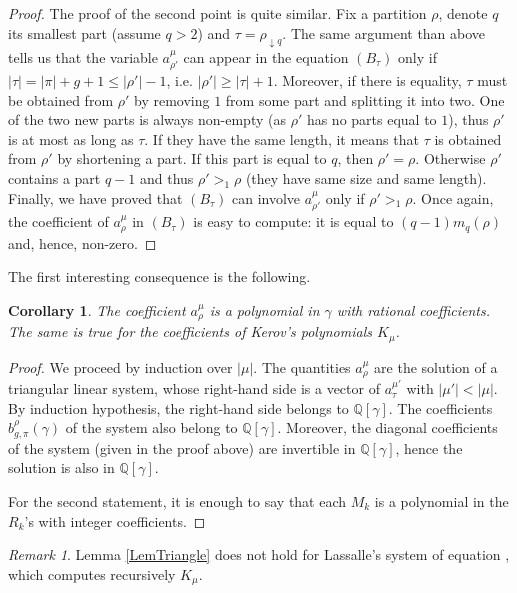 \documentclass[11pt]{amsart}
\theoremstyle{plain}
\newtheorem{corollary}[lemma]{Corollary}
\theoremstyle{remark}
\newtheorem*{remark}{Remark}
\newcommand{\QQ}{\mathbb{Q}}
\begin{document}
\begin{proof}
The proof of the second point is quite similar.
Fix a partition $\rho$, denote $q$ its smallest part (assume $q>2$)
and $\tau=\rho_{\downarrow q}$.
The same argument than above tells us that
the variable $a^\mu_{\rho'}$ can appear in the equation $(B_\tau)$ only if
$|\tau|=|\pi|+g+1 \leq |\rho'| - 1$, { i.e.} $|\rho'| \geq |\tau|+1$.
Moreover, if there is equality,  $\tau$ must be obtained from $\rho'$ by removing
$1$ from some part and splitting it into two.
One of the two new parts is always non-empty (as $\rho'$ has no parts equal to $1$),
thus $\rho'$ is at most as long as $\tau$.
If they have the same length, it means that $\tau$ is obtained from $\rho'$ by shortening
a part.
If this part is equal to $q$, then $\rho'=\rho$.
Otherwise $\rho'$ contains a part $q-1$ and thus $\rho' >_1 \rho$
(they have same size and same length).
Finally, we have proved that $(B_\tau)$ can involve $a^\mu_{\rho'}$
only if $\rho' >_1 \rho$. 
Once again, the coefficient of $a^\mu_\rho$ in $(B_\tau)$ is easy to compute:
it is equal to $(q-1) m_q(\rho)$ and, hence, non-zero.
\end{proof}

The first interesting consequence is the following.

\begin{corollary}
    The coefficient $a_\rho^\mu$ is a polynomial in $\gamma$ with rational coefficients.
    The same is true for the coefficients of Kerov's polynomials $K_\mu$.
\end{corollary}
\begin{proof}
    We proceed by induction over $|\mu|$.
    The quantities $a_\rho^\mu$ are the solution of a triangular linear system,
    whose right-hand side is a vector of $a_\tau^{\mu'}$ with $|\mu'|<|\mu|$.
    By induction hypothesis, the right-hand side belongs to $\QQ[\gamma]$.
    The coefficients $b_{g,\pi}^\rho(\gamma)$ of the system also belong to $\QQ[\gamma]$.
    Moreover, the diagonal coefficients of the system (given in the proof above)
    are invertible in $\QQ[\gamma]$, hence the solution is also in $\QQ[\gamma]$.

    For the second statement, it is enough to say that each $M_k$ is a polynomial in the
    $R_k$'s with integer coefficients.
\end{proof}

\begin{remark}
    Lemma \ref{LemTriangle} does not hold for Lassalle's system of equation
    \cite[Equations (9.1) and (9.2)]{Lassalle2009}, which computes recursively $K_\mu$.
\end{remark}
\end{document}
